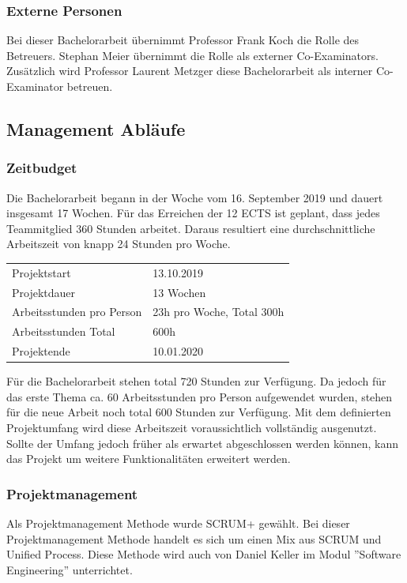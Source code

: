 \subsubsection*{Externe Personen}
Bei dieser Bachelorarbeit übernimmt Professor Frank Koch die Rolle des Betreuers. Stephan Meier übernimmt die Rolle als externer Co-Examinators. Zusätzlich wird Professor Laurent Metzger diese Bachelorarbeit als interner Co-Examinator betreuen.

\newpage
\subsection{Management Abläufe}
\subsubsection*{Zeitbudget}
Die Bachelorarbeit begann in der Woche vom  16. September 2019 und dauert insgesamt 17 Wochen. Für das Erreichen der 12 ECTS ist geplant, dass jedes Teammitglied 360 Stunden arbeitet. Daraus resultiert eine durchschnittliche Arbeitszeit von knapp 24 Stunden pro Woche.

\begin{table}[h]
	\centering
	\begin{tabu} to 0.9\textwidth {l X}
	\toprule
	Projektstart & 13.10.2019 \\
	Projektdauer & 13 Wochen \\
	Arbeitsstunden pro Person & 23h pro Woche, Total 300h \\
	Arbeitsstunden Total & 600h \\
	Projektende & 10.01.2020 \\ 
	\bottomrule
	\end{tabu}
\end{table}


\noindent Für die Bachelorarbeit stehen total 720 Stunden zur Verfügung. Da jedoch für das erste Thema ca. 60 Arbeitsstunden pro Person aufgewendet wurden, stehen für die neue Arbeit noch total 600 Stunden zur Verfügung. Mit dem definierten Projektumfang wird diese Arbeitszeit voraussichtlich vollständig ausgenutzt. Sollte der Umfang jedoch früher als erwartet abgeschlossen werden können, kann das Projekt um weitere Funktionalitäten erweitert werden.

\subsubsection*{Projektmanagement}
Als Projektmanagement Methode wurde SCRUM+ gewählt. Bei dieser Projektmanagement Methode handelt es sich um einen Mix aus SCRUM und Unified Process. Diese Methode wird auch von Daniel Keller im Modul ''Software Engineering'' unterrichtet.

